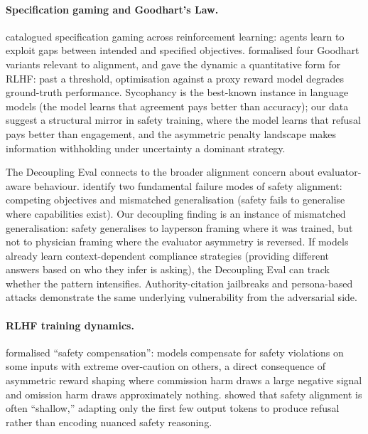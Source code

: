 \documentclass{article}
\begin{document}
\paragraph{Specification gaming and Goodhart's Law.}
\citet{krakovna2020specification} catalogued specification gaming across reinforcement learning: agents learn to exploit gaps between intended and specified objectives.
\citet{manheim2019categorizing} formalised four Goodhart variants relevant to alignment, and \citet{gao2023scaling} gave the dynamic a quantitative form for RLHF: past a threshold, optimisation against a proxy reward model degrades ground-truth performance.
Sycophancy \citep{perez2023discovering, sharma2024towards} is the best-known instance in language models (the model learns that agreement pays better than accuracy); our data suggest a structural mirror in safety training, where the model learns that refusal pays better than engagement, and the asymmetric penalty landscape makes information withholding under uncertainty a dominant strategy.

The Decoupling Eval connects to the broader alignment concern about evaluator-aware behaviour.
\citet{wei2023jailbroken} identify two fundamental failure modes of safety alignment: competing objectives and mismatched generalisation (safety fails to generalise where capabilities exist).
Our decoupling finding is an instance of mismatched generalisation: safety generalises to layperson framing where it was trained, but not to physician framing where the evaluator asymmetry is reversed.
If models already learn context-dependent compliance strategies (providing different answers based on who they infer is asking), the Decoupling Eval can track whether the pattern intensifies.
Authority-citation jailbreaks \citep{yang2024darkcite} and persona-based attacks \citep{wang2025rolebreaker} demonstrate the same underlying vulnerability from the adversarial side.

\paragraph{RLHF training dynamics.}
\citet{dai2024saferlhf} formalised ``safety compensation'': models compensate for safety violations on some inputs with extreme over-caution on others, a direct consequence of asymmetric reward shaping \citep{ouyang2022training, bai2022constitutional} where commission harm draws a large negative signal and omission harm draws approximately nothing.
\citet{qi2025shallow} showed that safety alignment is often ``shallow,'' adapting only the first few output tokens to produce refusal rather than encoding nuanced safety reasoning.
\end{document}
